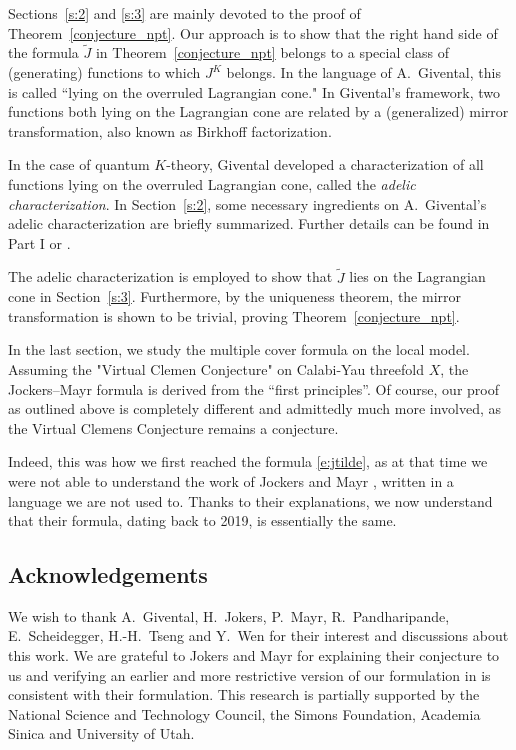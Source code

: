\documentclass[11pt]{amsart}
\newtheorem*{main theorem*}{Main Theorem}
\theoremstyle{remark}
\numberwithin{equation}{section}
\begin{document}
Sections~\ref{s:2} and \ref{s:3} are mainly devoted to the proof of Theorem~\ref{conjecture_npt}. Our approach is to show that the right hand side of the formula $\tilde{J}$ in Theorem~\ref{conjecture_npt} belongs to a special class of (generating) functions to which $J^K$ belongs. In the language of A.~Givental, this is called ``lying on the overruled Lagrangian cone." In Givental's framework, two functions both lying on the Lagrangian cone are related by a (generalized) mirror transformation, also known as Birkhoff factorization. 

In the case of quantum $K$-theory, Givental developed a characterization of all functions lying on the overruled Lagrangian cone, called the \emph{adelic characterization}.
In Section~\ref{s:2}, some necessary ingredients on A.~Givental's adelic characterization are briefly summarized. Further details can be found in Part I \cite{Chou_Lee_2022_QKGVI} or \cite{Givental_Tonita_2011}.

The adelic characterization is employed to show that $\tilde{J}$ lies on the Lagrangian cone in Section~\ref{s:3}. Furthermore, by the uniqueness theorem, the mirror transformation is shown to be trivial, proving Theorem~\ref{conjecture_npt}.

In the last section, we study the multiple cover formula on the local model. Assuming the "Virtual Clemen Conjecture" on Calabi-Yau threefold $X$, the Jockers--Mayr formula is derived from the ``first principles''. Of course, our proof as outlined above is completely different and admittedly much more involved, as the Virtual Clemens Conjecture remains a conjecture.

Indeed, this was how we first reached the formula \eqref{e:jtilde}, as at that time we were not able to understand the work of Jockers and Mayr \cite{Jockers_Mayr_2019}, written in a language we are not used to. Thanks to their explanations, we now understand that their formula, dating back to 2019, is essentially the same.
 



\subsection*{Acknowledgements}
We wish to thank A.~Givental, H.~Jokers, P.~Mayr, R.~Pandharipande, E.~Scheidegger, H.-H.~Tseng and Y.~Wen for their interest and discussions about this work. We are grateful to Jokers and Mayr for explaining their conjecture to us and verifying an earlier and more restrictive version of our formulation in \cite{Chou_Lee_2022_Bumsig} is consistent with their formulation.
This research is partially supported by the National Science and Technology Council, the Simons Foundation, Academia Sinica and University of Utah.
\end{document}
